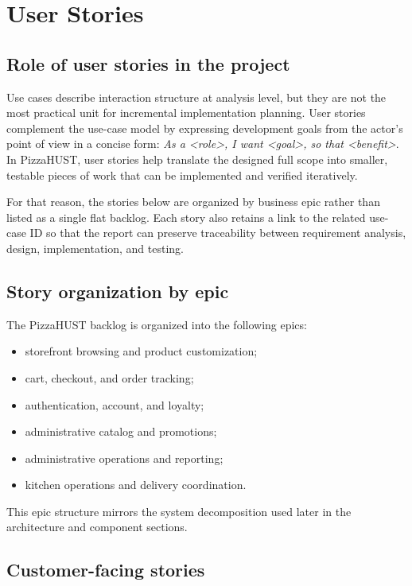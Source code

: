 \section{User Stories}

\subsection{Role of user stories in the project}

Use cases describe interaction structure at analysis level, but they are not the most practical unit for incremental implementation planning. User stories complement the use-case model by expressing development goals from the actor's point of view in a concise form: \emph{As a <role>, I want <goal>, so that <benefit>}. In PizzaHUST, user stories help translate the designed full scope into smaller, testable pieces of work that can be implemented and verified iteratively.

For that reason, the stories below are organized by business epic rather than listed as a single flat backlog. Each story also retains a link to the related use-case ID so that the report can preserve traceability between requirement analysis, design, implementation, and testing.

\subsection{Story organization by epic}

The PizzaHUST backlog is organized into the following epics:

\begin{itemize}
    \item storefront browsing and product customization;
    \item cart, checkout, and order tracking;
    \item authentication, account, and loyalty;
    \item administrative catalog and promotions;
    \item administrative operations and reporting;
    \item kitchen operations and delivery coordination.
\end{itemize}

This epic structure mirrors the system decomposition used later in the architecture and component sections.

\subsection{Customer-facing stories}

